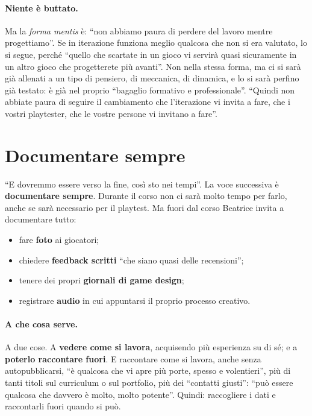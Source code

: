 \paragraph{Niente è buttato.} Ma la \emph{forma mentis} è: ``non abbiamo paura di
perdere del lavoro mentre progettiamo''. Se in iterazione funziona meglio qualcosa
che non si era valutato, lo si segue, perché ``quello che scartate in un gioco vi
servirà quasi sicuramente in un altro gioco che progetterete più avanti''. Non nella
stessa forma, ma ci si sarà già allenati a un tipo di pensiero, di meccanica, di
dinamica, e lo si sarà perfino già testato: è già nel proprio ``bagaglio formativo e
professionale''. ``Quindi non abbiate paura di seguire il cambiamento che
l'iterazione vi invita a fare, che i vostri playtester, che le vostre persone vi
invitano a fare''.

\section{Documentare sempre}
\label{a9:sec:documentare}

``E dovremmo essere verso la fine, così sto nei tempi''. La voce successiva è
\textbf{documentare sempre}. Durante il corso non ci sarà molto tempo per farlo,
anche se sarà necessario per il playtest. Ma fuori dal corso Beatrice invita a
documentare tutto:
\begin{itemize}
  \item fare \textbf{foto} ai giocatori;
  \item chiedere \textbf{feedback scritti} ``che siano quasi delle recensioni'';
  \item tenere dei propri \textbf{giornali di game design};
  \item registrare \textbf{audio} in cui appuntarsi il proprio processo creativo.
\end{itemize}

\paragraph{A che cosa serve.} A due cose. A \textbf{vedere come si lavora},
acquisendo più esperienza su di sé; e a \textbf{poterlo raccontare fuori}. E
raccontare come si lavora, anche senza autopubblicarsi, ``è qualcosa che vi apre più
porte, spesso e volentieri'', più di tanti titoli sul curriculum o sul portfolio, più
dei ``contatti giusti'': ``può essere qualcosa che davvero è molto, molto potente''.
Quindi: raccogliere i dati e raccontarli fuori quando si può.

